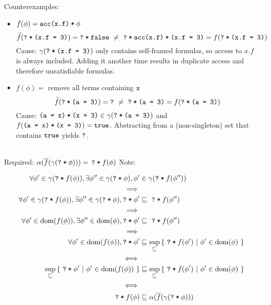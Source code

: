 \documentclass[11pt,a4paper]{article}
\begin{document}
Counterexamples:
\begin{itemize}
\item $f(\phi) = \texttt{\texttt{acc(x.f)}\:*\:$\phi$}$ \\
    \begin{equation*}
    \widetilde{f}(\texttt{\texttt{?}\:*\:$\texttt{(\texttt{x.f} = 3)}$}) = \texttt{\texttt{?}\:*\:$\texttt{false}$} 
    ~\neq~
    \texttt{\texttt{?}\:*\:$\texttt{\texttt{acc(x.f)}\:*\:\texttt{(\texttt{x.f} = 3)}}$} = f(\texttt{\texttt{?}\:*\:$\texttt{(\texttt{x.f} = 3)}$})
    \end{equation*}
    Cause: $\gamma(\texttt{\texttt{?}\:*\:$\texttt{(\texttt{x.f} = 3)}$})$ only contains self-framed formulas, so access to $x.f$ is always included. Adding it another time results in duplicate access and therefore unsatisfiable formulas.
\item $f(\phi) = $ remove all terms containing $\texttt{x}$ \\
    \begin{equation*}
    \widetilde{f}(\texttt{\texttt{?}\:*\:$\texttt{(a = 3)}$}) = \texttt{?} 
    ~\neq~
    \texttt{\texttt{?}\:*\:$\texttt{(a = 3)}$} = f(\texttt{\texttt{?}\:*\:$\texttt{(a = 3)}$})
    \end{equation*}
    Cause: $\texttt{\texttt{(a = x)}\:*\:\texttt{(x = 3)}} \in \gamma(\texttt{\texttt{?}\:*\:$\texttt{(a = 3)}$})$ and $f(\texttt{\texttt{(a = x)}\:*\:\texttt{(x = 3)}}) = \texttt{true}$.
    Abstracting from a (non-singleton) set that contains $\texttt{true}$ yields $\texttt{?}$.
\end{itemize}

~\\
Required: $\alpha(\overline{f}(\gamma(\texttt{\texttt{?}\:*\:$\phi$}))) =\, \texttt{\texttt{?}\:*\:$f(\phi)$}$
Note: 

\begin{align*}
\forall \phi' \in \gamma(\texttt{\texttt{?}\:*\:$f(\phi)$}), \exists \phi'' \in \gamma(\texttt{\texttt{?}\:*\:$\phi$}), \phi' &\in \gamma(\texttt{\texttt{?}\:*\:$f(\phi'')$}) \\
\implies \\
\forall \phi' \in \gamma(\texttt{\texttt{?}\:*\:$f(\phi)$}), \exists \phi'' \in \gamma(\texttt{\texttt{?}\:*\:$\phi$}), \texttt{\texttt{?}\:*\:$\phi'$} &\sqsubseteq \,\,\texttt{\texttt{?}\:*\:$f(\phi'')$} \\
\implies \\
\forall \phi' \in \textrm{dom}(f(\phi)), \exists \phi'' \in \textrm{dom}(\phi), \texttt{\texttt{?}\:*\:$\phi'$} &\sqsubseteq \,\,\texttt{\texttt{?}\:*\:$f(\phi'')$} \\
\implies \\
\forall \phi' \in \textrm{dom}(f(\phi)), \texttt{\texttt{?}\:*\:$\phi'$} &\sqsubseteq \sup_{\sqsubseteq} {\{~ \texttt{\texttt{?}\:*\:$f(\phi')$} ~|~ \phi' \in \textrm{dom}(\phi) ~\}} \\
\iff \\
\sup_{\sqsubseteq} {\{~ \texttt{\texttt{?}\:*\:$\phi'$} ~|~ \phi' \in \textrm{dom}(f(\phi)) ~\}} &\sqsubseteq \sup_{\sqsubseteq} {\{~ \texttt{\texttt{?}\:*\:$f(\phi')$} ~|~ \phi' \in \textrm{dom}(\phi) ~\}} \\
\iff \\
\texttt{\texttt{?}\:*\:$f(\phi)$}  &\sqsubseteq \alpha(\overline{f}(\gamma(\texttt{\texttt{?}\:*\:$\phi$})))
\end{align*}
\end{document}
